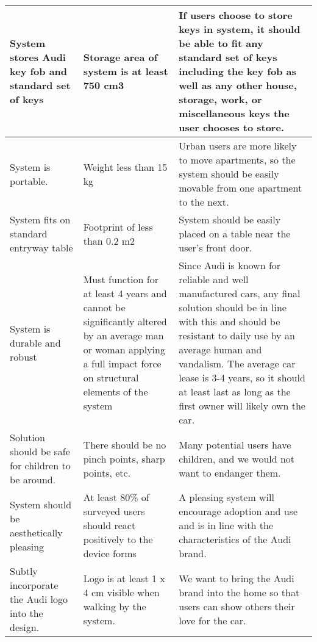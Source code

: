 \begin{center}
\tablelasttail{\hline}
\begin{supertabular}{| p{32mm} | p{50mm} | p{53mm} | }
		\hline System stores Audi key fob and standard set of keys & Storage area of system is at least 750 cm3 & If users choose to store keys in system, it should be able to fit any standard set of keys including the key fob as well as any other house, storage, work, or miscellaneous keys the user chooses to store.\\
		\hline System is portable. & Weight less than 15 kg & Urban users are more likely to move apartments, so the system should be easily movable from one apartment to the next.\\
		\hline System fits on standard entryway table & Footprint of less than 0.2 m2 & System should be easily placed on a table near the user's front door. \\
		\hline System is durable and robust & Must function for at least 4 years and cannot be significantly altered by an average man or woman applying a full impact force on structural elements of the system & Since Audi is known for reliable and well manufactured cars, any final solution should be in line with this and should be resistant to daily use by an average human and vandalism. The average car lease is 3-4 years, so it should at least last as long as the first owner will likely own the car.\\
		\hline Solution should be safe for children to be around. & There should be no pinch points, sharp points, etc.& Many potential users have children, and we would not want to endanger them.\\
		\hline System should be aesthetically pleasing & At least 80\% of surveyed users should react positively to the device forms & A pleasing system will encourage adoption and use and is in line with the characteristics of the Audi brand.\\
		\hline Subtly incorporate the Audi logo into the design. & Logo is at least 1 x 4 cm visible when walking by the system. & We want to bring the Audi brand into the home so that users can show others their love for the car.\\
\end{supertabular}
\end{center}

